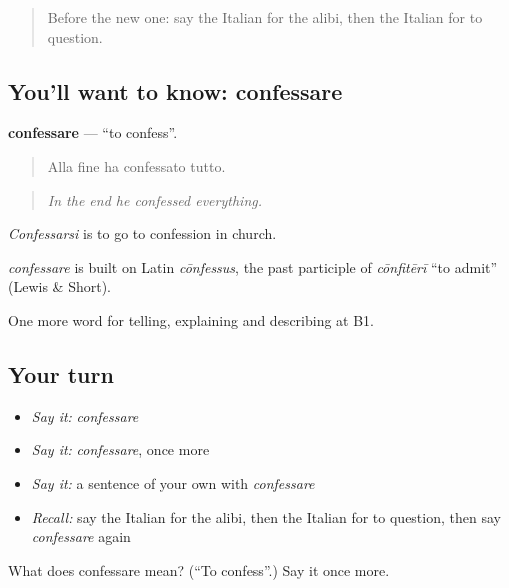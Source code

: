 \label{lesson:IT-C296-confessare}



\begin{quote}
Before the new one: say the Italian for the alibi, then the Italian for to question.
\end{quote}

\subsection*{You'll want to know: confessare}
\textbf{confessare} — \textquotedblleft{}to confess\textquotedblright{}.

\begin{quote}
Alla fine ha confessato tutto.
\end{quote}

\begin{quote}
\emph{In the end he confessed everything.}
\end{quote}

\emph{Confessarsi} is to go to confession in church.

\begin{cousinweb}
\emph{confessare} is built on Latin \emph{cōnfessus}, the past participle of \emph{cōnfitērī} \textquotedblleft{}to admit\textquotedblright{} (Lewis \& Short).
\end{cousinweb}

\begin{grammarlens}[title={What you've built}]
One more word for telling, explaining and describing at B1.
\end{grammarlens}

\subsection*{Your turn}
\begin{itemize}
\raggedright
  \item \emph{Say it:} \emph{confessare}
  \item \emph{Say it:} \emph{confessare}, once more
  \item \emph{Say it:} a sentence of your own with \emph{confessare}
  \item \emph{Recall:} say the Italian for the alibi, then the Italian for to question, then say \emph{confessare} again
\end{itemize}

\begin{tcolorbox}[breakable,colback=teal!4,colframe=teal!35!black,title={Before you move on}]
What does confessare mean? (\textquotedblleft{}To confess\textquotedblright{}.) Say it once more.
\end{tcolorbox}
